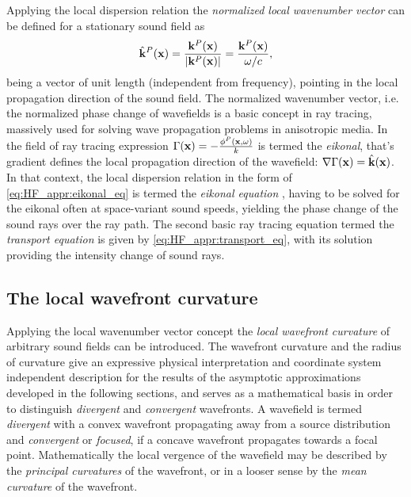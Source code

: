 Applying the local dispersion relation the \emph{normalized local wavenumber vector} can be defined for a stationary sound field as
\begin{equation}
\hat{\mathbf{k}}^P(\mathbf{x}) = \frac{\mathbf{k}^P(\mathbf{x})}{|\mathbf{k}^P(\mathbf{x})|} = \frac{\mathbf{k}^P(\mathbf{x})}{\omega/c},
\end{equation}
being a vector of unit length (independent from frequency), pointing in the local propagation direction of the sound field.
%
The normalized wavenumber vector, i.e. the normalized phase change of wavefields is a basic concept in ray tracing, massively used for solving wave propagation problems in anisotropic media.
In the field of ray tracing expression $\Gamma(\mathbf{x}) = -\frac{\phi^P(\mathbf{x},\omega)}{k}$ is termed the \emph{eikonal}, that's gradient defines the local propagation direction of the wavefield: $\nabla \Gamma(\mathbf{x}) = \hat{\mathbf{k}}(\mathbf{x})$.
In that context, the local dispersion relation in the form of \eqref{eq:HF_appr:eikonal_eq} is termed the \emph{eikonal equation} \cite{Pierce1991, Kinsler2000}, having to be solved for the eikonal often at space-variant sound speeds, yielding the phase change of the sound rays over the ray path.
The second basic ray tracing equation termed the \emph{transport equation} is given by \eqref{eq:HF_appr:transport_eq}, with its solution providing the intensity change of sound rays.

\subsection{The local wavefront curvature}
%
Applying the local wavenumber vector concept the \emph{local wavefront curvature} of arbitrary sound fields can be introduced.
The wavefront curvature and the radius of curvature give an expressive physical interpretation and coordinate system independent description for the results of the asymptotic approximations developed in the following sections, and serves as a mathematical basis in order to distinguish \emph{divergent} and \emph{convergent} wavefronts.
A wavefield is termed \emph{divergent} with a convex wavefront propagating away from a source distribution and \emph{convergent} or \emph{focused}, if a concave wavefront propagates towards a focal point.
Mathematically the local vergence of the wavefield may be described by the \emph{principal curvatures} of the wavefront, or in a looser sense by the \emph{mean curvature} of the wavefront.

